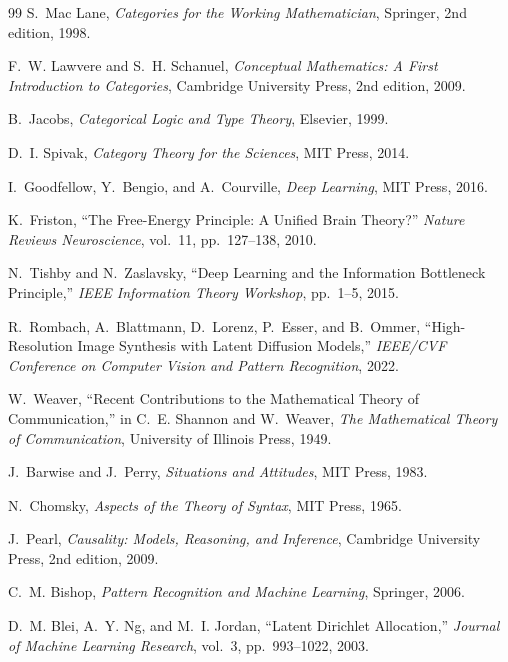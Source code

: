 \documentclass[12pt,a4paper]{article}
\theoremstyle{definition}
\theoremstyle{remark}
\begin{document}
\begin{thebibliography}{99}
S.~Mac Lane,
\newblock \emph{Categories for the Working Mathematician},
\newblock Springer, 2nd edition, 1998.

F.~W. Lawvere and S.~H. Schanuel,
\newblock \emph{Conceptual Mathematics: A First Introduction to Categories},
\newblock Cambridge University Press, 2nd edition, 2009.

B.~Jacobs,
\newblock \emph{Categorical Logic and Type Theory},
\newblock Elsevier, 1999.

D.~I. Spivak,
\newblock \emph{Category Theory for the Sciences},
\newblock MIT Press, 2014.

I.~Goodfellow, Y.~Bengio, and A.~Courville,
\newblock \emph{Deep Learning},
\newblock MIT Press, 2016.

K.~Friston,
\newblock ``The Free-Energy Principle: A Unified Brain Theory?''
\newblock \emph{Nature Reviews Neuroscience}, vol.~11, pp.~127--138, 2010.

N.~Tishby and N.~Zaslavsky,
\newblock ``Deep Learning and the Information Bottleneck Principle,''
\newblock \emph{IEEE Information Theory Workshop}, pp.~1--5, 2015.

R.~Rombach, A.~Blattmann, D.~Lorenz, P.~Esser, and B.~Ommer,
\newblock ``High-Resolution Image Synthesis with Latent Diffusion Models,''
\newblock \emph{IEEE/CVF Conference on Computer Vision and Pattern Recognition}, 2022.

W.~Weaver,
\newblock ``Recent Contributions to the Mathematical Theory of Communication,''
\newblock in C.~E. Shannon and W.~Weaver, \emph{The Mathematical Theory of Communication},
\newblock University of Illinois Press, 1949.

J.~Barwise and J.~Perry,
\newblock \emph{Situations and Attitudes},
\newblock MIT Press, 1983.

N.~Chomsky,
\newblock \emph{Aspects of the Theory of Syntax},
\newblock MIT Press, 1965.

J.~Pearl,
\newblock \emph{Causality: Models, Reasoning, and Inference},
\newblock Cambridge University Press, 2nd edition, 2009.

C.~M. Bishop,
\newblock \emph{Pattern Recognition and Machine Learning},
\newblock Springer, 2006.

D.~M. Blei, A.~Y. Ng, and M.~I. Jordan,
\newblock ``Latent Dirichlet Allocation,''
\newblock \emph{Journal of Machine Learning Research}, vol.~3, pp.~993--1022, 2003.


\end{thebibliography}
\end{document}
